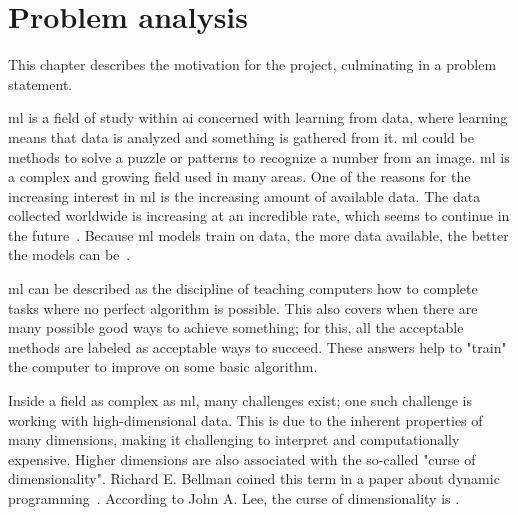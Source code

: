 \chapter{Problem analysis}\label{cha:problem-analysis}
This chapter describes the motivation for the project, culminating in a problem statement.


\gls{ml}  is a field of study within \gls{ai} concerned with learning from data, where learning means that data is analyzed and something is gathered from it.   \gls{ml}  could be methods to solve a puzzle or patterns to recognize a number from an image. \gls{ml}  is a complex and growing field used in many areas. One of the reasons for the increasing interest in \gls{ml} is the increasing amount of available data. The data collected worldwide is increasing at an incredible rate, which seems to continue in the future~\cite{data-never-sleeps}. Because \gls{ml} models train on data, the more data available, the better the models can be~\cite{Unreasonable-effectiveness-of-data-Norvig}.

\gls{ml} can be described as the discipline of teaching computers how to complete tasks where no perfect algorithm is possible. This also covers when there are many possible good ways to achieve something; for this, all the acceptable methods are labeled as acceptable ways to succeed. These answers help to "train" the computer to improve on some basic algorithm\cite{alpaydin2020introduction}.

Inside a field as complex as \gls{ml}, many challenges exist; one such challenge is working with high-dimensional data. This is due to the inherent properties of many dimensions, making it challenging to interpret and computationally expensive. Higher dimensions are also associated with the so-called "curse of dimensionality". Richard E. Bellman coined this term in a paper about dynamic programming~\cite{bellmanrand}. According to John A. Lee, the curse of dimensionality is .

